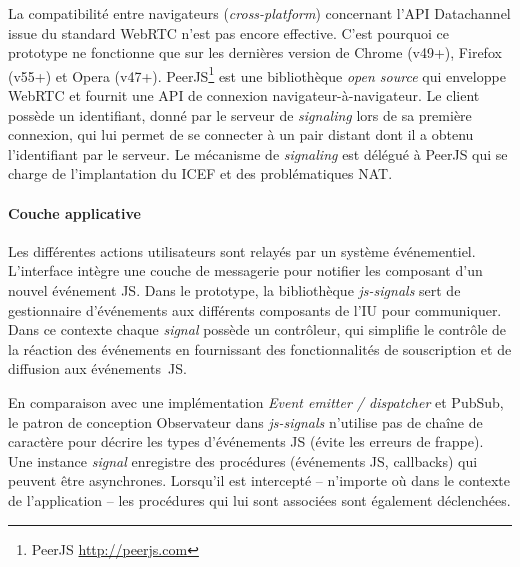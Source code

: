 La compatibilité entre navigateurs 
(\textit{cross-platform}) concernant 
l'\gls{API} Datachannel issue du standard \gls{WebRTC} n'est pas encore 
effective. C'est pourquoi ce prototype ne fonctionne que sur les dernières 
version de Chrome (v49+), Firefox (v55+) et Opera (v47+). 
PeerJS\footnote{PeerJS  \url{http://peerjs.com}} est une 
bibliothèque \textit{open source} qui enveloppe WebRTC et fournit une \gls{API} 
de connexion navigateur-à-navigateur.
Le client possède un identifiant, donné par le serveur de \textit{signaling} lors 
de sa première connexion, qui lui permet de se connecter à un pair distant 
dont il a obtenu l'identifiant par le serveur. Le mécanisme 
de \textit{signaling} est délégué à PeerJS qui se charge de l'implantation du 
\gls{ICEF} et des problématiques \gls{NAT}. 


		\paragraph{Couche applicative}
		
Les différentes actions utilisateurs sont relayés par un système 
événementiel. L'interface intègre une couche de messagerie pour notifier les 
composant d'un nouvel événement \gls{JS}. Dans le prototype, la 
bibliothèque 
\textit{js-signals} sert de gestionnaire d'événements aux différents 
composants de l'\gls{IU} pour 
communiquer. Dans ce contexte chaque \textit{signal} possède un 
contrôleur, qui simplifie le contrôle de la réaction des événements en 
fournissant des fonctionnalités de souscription et de diffusion aux
événements~\gls{JS}. 

En comparaison avec une implémentation \textit{Event 
emitter / dispatcher} et \gls{PubSub}, le patron de conception 
Observateur dans \textit{js-signals} n'utilise pas de chaîne de caractère pour 
décrire les types d'événements \gls{JS} (évite les erreurs de frappe).
Une instance \textit{signal} enregistre des procédures (événements \gls{JS}, 
callbacks) qui peuvent être asynchrones. 
Lorsqu'il est intercepté -- n'importe où dans le contexte de l'application -- les 
procédures qui lui sont associées sont également déclenchées.